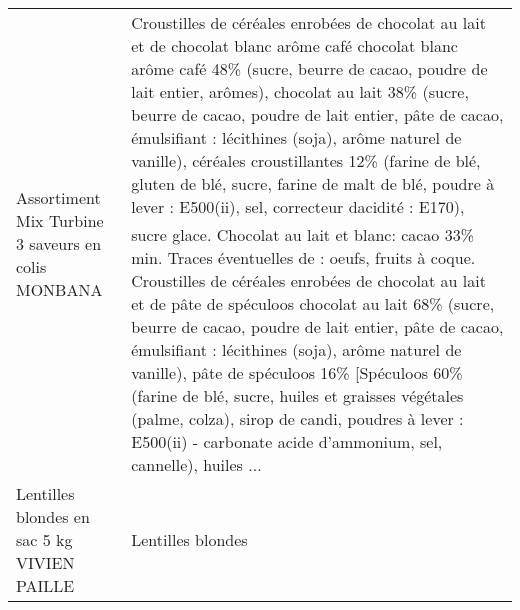 \begin{longtable}{p{5cm}p{10cm}}
                                                       Assortiment Mix Turbine 3 saveurs en colis MONBANA &  Croustilles de céréales enrobées de chocolat au lait et de chocolat blanc arôme café  chocolat blanc arôme café 48\% (sucre, beurre de cacao, poudre de lait entier, arômes), chocolat au lait 38\% (sucre, beurre de cacao, poudre de lait entier, pâte de cacao, émulsifiant : lécithines (soja), arôme naturel de vanille), céréales croustillantes 12\% (farine de blé, gluten de blé, sucre, farine de malt de blé, poudre à lever : E500(ii), sel, correcteur dacidité : E170), sucre glace.   Chocolat au lait et blanc: cacao 33\% min. Traces éventuelles de : oeufs, fruits à coque.  Croustilles de céréales enrobées de chocolat au lait et de pâte de spéculoos  chocolat au lait 68\% (sucre, beurre de cacao, poudre de lait entier, pâte de cacao, émulsifiant : lécithines (soja), arôme naturel de vanille), pâte de spéculoos 16\% [Spéculoos 60\% (farine de blé, sucre, huiles et graisses végétales (palme, colza), sirop de candi, poudres à lever : E500(ii) - carbonate acide d'ammonium, sel, cannelle), huiles ... \\
                                                              Lentilles blondes en sac 5 kg VIVIEN PAILLE &                                                                                                                                                                                                                                                                                                                                                                                                                                                                                                                                                                                                                                                                                                                                                                                                                                                                                                                                                                                                                        Lentilles blondes \\

\end{longtable}
